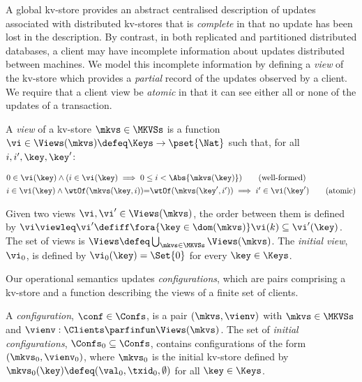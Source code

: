 A global kv-store provides an abstract centralised description of
updates associated with distributed kv-stores that is \emph{complete} in 
that no update has been lost in the description. By contrast, in
both replicated and partitioned distributed databases, a client may
have incomplete information about updates distributed between
machines.  We model this incomplete information by
defining a {\em view} of the kv-store which provides a {\em
  partial} record of the updates observed by a client. We require that a client view be {\em atomic} in that it can
see either all or none of the updates of a transaction.

\SpaceAboveDef
\begin{definition}[Views]
\label{def:view}
\label{def:cuts}
\label{def:views}
A \emph{view} of a kv-store \(\mkvs \in \MKVSs\) is a function
\(\vi \in \Views(\mkvs) \defeq \Keys \to\pset{\Nat}\) such that, for all \(i, i', \key, \key'\):

\SpaceAboveMath
\begin{align*}
    & 
    0 \in \vi(\key) 
    \land (i \in \vi(\key) \implies 0 \leq i < \Abs{ \mkvs(\key) }) 
    \tag{well-formed}
    \label{eq:view.wf}\\
    & 
    \begin{array}{@{}l@{}}
	i \in \vi(\key)  
  	\land \wtOf(\mkvs(\key, i)) {=} \wtOf(\mkvs(\key', i'))  
  	\implies i' \in \vi(\key')
    \end{array}
	\tag{atomic}
	\label{eq:view.atomic}
\end{align*}
\SpaceBelowMath

Given two views \(\vi, \vi' \in \Views(\mkvs)\), 
the order between them is defined by \(\vi \viewleq \vi' \defiff \fora{\key \in \dom(\mkvs)} \vi(k) \subseteq \vi'(\key)\).
The set of views is \(\Views \defeq \bigcup_{\mkvs \in \MKVSs} \Views(\mkvs)\).
The \emph{initial view}, \(\vi_{0}\),  is defined by
\(\vi_{0}(\key) = \Set{0}\) for every \(\key \in \Keys\). 
\end{definition}
\SpaceBelowDef

Our operational semantics updates \emph{configurations},  which are pairs
comprising a kv-store and a function describing the
views of a finite set of clients. 

\SpaceAboveDef
\begin{definition}[Configurations]
\label{def:configuration}
A \emph{configuration}, \(\conf \in \Confs \),  is a pair \( (\mkvs, \vienv)\)
with \(\mkvs \in \MKVSs\) and
\(\vienv : \Clients \parfinfun \Views(\mkvs)\). 
The set of \emph{initial configurations}, \(\Confs_0 \subseteq \Confs\),
contains configurations of the form \( (\mkvs_0, \vienv_0)\), where
\(\mkvs_0\) is the initial kv-store defined by
\(\mkvs_{0}(\key)\defeq  (\val_0, \txid_0, \emptyset)\) for
all \(\key \in \Keys\). 
\end{definition}
\SpaceBelowDef


